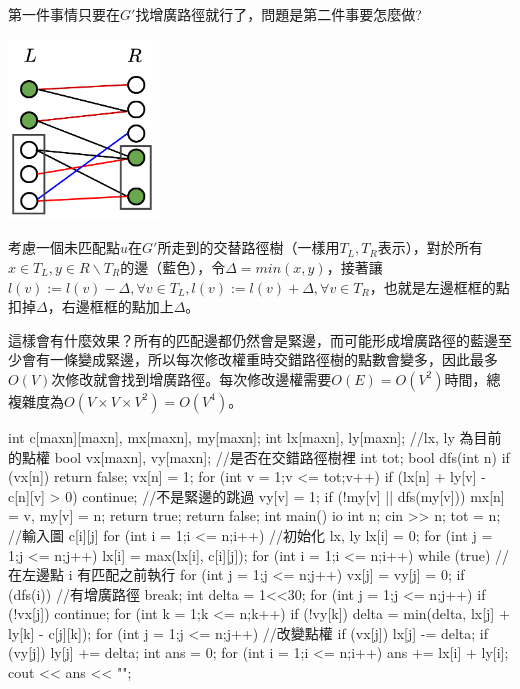 第一件事情只要在$G'$找增廣路徑就行了，問題是第二件事要怎麼做?
\begin{center}
\includegraphics[width=4cm]{images/Matching/KM.png}
\end{center}
考慮一個未匹配點$u$在$G'$所走到的交替路徑樹（一樣用$T_L, T_R$表示），對於所有$x \in T_L, y \in R \backslash T_R$的邊（藍色），令$\Delta = min(x, y)$，接著讓$l(v) := l(v) - \Delta, \forall v \in T_L, l(v) := l(v) + \Delta, \forall v \in T_R$，也就是左邊框框的點扣掉$\Delta$，右邊框框的點加上$\Delta$。
\par 這樣會有什麼效果？所有的匹配邊都仍然會是緊邊，而可能形成增廣路徑的藍邊至少會有一條變成緊邊，所以每次修改權重時交錯路徑樹的點數會變多，因此最多$O(V)$次修改就會找到增廣路徑。每次修改邊權需要$O(E) = O(V^2)$時間，總複雜度為$O(V \times V \times V^2) = O(V^4)$。
\begin{C++}
int c[maxn][maxn], mx[maxn], my[maxn];
int lx[maxn], ly[maxn]; //lx, ly 為目前的點權
bool vx[maxn], vy[maxn]; //是否在交錯路徑樹裡 
int tot;
bool dfs(int n) {
    if (vx[n]) return false;
    vx[n] = 1;
    for (int v = 1;v <= tot;v++) {
        if (lx[n] + ly[v] - c[n][v] > 0) continue; //不是緊邊的跳過
        vy[v] = 1;
        if (!my[v] || dfs(my[v])) {
            mx[n] = v, my[v] = n;
            return true;
        }
    }
    return false;
}
int main() {
    io
    int n;
    cin >> n;
    tot = n;
    //輸入圖 c[i][j]
    for (int i = 1;i <= n;i++) { //初始化 lx, ly
        lx[i] = 0;
        for (int j = 1;j <= n;j++) lx[i] = max(lx[i], c[i][j]);
    }
    for (int i = 1;i <= n;i++) {
        while (true) { //在左邊點 i 有匹配之前執行
            for (int j = 1;j <= n;j++) vx[j] = vy[j] = 0;
            if (dfs(i)) { //有增廣路徑
                break;
            }
            int delta = 1<<30;
            for (int j = 1;j <= n;j++) {
                if (!vx[j]) continue;
                for (int k = 1;k <= n;k++) {
                    if (!vy[k]) {
                        delta = min(delta, lx[j] + ly[k] - c[j][k]);     
                    }
                }
            }
            for (int j = 1;j <= n;j++) { //改變點權
                if (vx[j]) lx[j] -= delta;
                if (vy[j]) ly[j] += delta;
            }
        }
    }
    int ans = 0;
    for (int i = 1;i <= n;i++) ans += lx[i] + ly[i];
    cout << ans << "\n";
}  
\end{C++}
